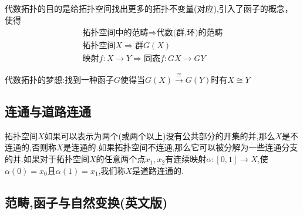\documentclass{article}
\begin{document}
代数拓扑的目的是给拓扑空间找出更多的拓扑不变量(对应),引入了\textsc{函子}的概念，使得
\begin{eqnarray*}
\text{拓扑空间中的范畴} \Rightarrow \text{代数(群,环)的范畴}\\
\text{拓扑空间}X \Rightarrow \text{群}G(X)\\
\text{映射} f : X \to Y \Rightarrow \text{同态} f : GX \to GY
\end{eqnarray*}

代数拓扑的梦想:找到一种函子$G$使得当$G(X)\xrightarrow{\cong}G(Y)$时有$X\cong Y$
\subsection{连通与道路连通}
\begin{definition}
    拓扑空间$X$如果可以表示为两个(或两个以上)没有公共部分的开集的并,那么$X$是不连通的,否则称$X$是连通的.如果拓扑空间不连通,那么它可以被分解为一些连通分支的并.如果对于拓扑空间$X$的任意两个点$x_1,x_2$有连续映射$\alpha : [0,1] \to X$,使$\alpha(0) = x_0$且$\alpha(1) = x_1$,我们称$X$是道路连通的.
\end{definition}
\subsection{范畴,函子与自然变换(英文版)\cite{spanier1989algebraic}}
\end{document}

